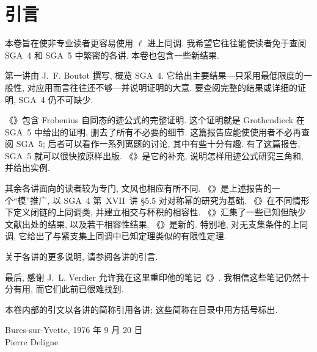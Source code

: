 \chapter*{引言}
本卷旨在使非专业读者更容易使用 $\ell$ 进上同调. 我希望它往往能使读者免于查阅 SGA~4 和 SGA~5 中繁密的各讲. 本卷也包含一些新结果.

第一讲由 J.~F. Boutot 撰写, 概览 SGA~4. 它给出主要结果---只采用最低限度的一般性, 对应用而言往往还不够---并说明证明的大意. 要查阅完整的结果或详细的证明, SGA~4 仍不可缺少.

《》包含 Frobenius 自同态的迹公式的完整证明. 这个证明就是 Grothendieck 在 SGA~5 中给出的证明, 删去了所有不必要的细节. 这篇报告应能使使用者不必再查阅 SGA~5; 后者可以看作一系列离题的讨论, 其中有些十分有趣. 有了这篇报告, SGA~5 就可以很快按原样出版. 《》是它的补充, 说明怎样用迹公式研究三角和, 并给出实例.

其余各讲面向的读者较为专门, 文风也相应有所不同. 《》是上述报告的一个“模”推广, 以 SGA~4 第~XVII~讲 \S5.5 对对称幂的研究为基础. 《》在不同情形下定义闭链的上同调类, 并建立相交与杯积的相容性. 《》汇集了一些已知但缺少文献出处的结果, 以及若干相容性结果. 《》是新的. 特别地, 对无支集条件的上同调, 它给出了与紧支集上同调中已知定理类似的有限性定理.

关于各讲的更多说明, 请参阅各讲的引言.

最后, 感谢 J.~L. Verdier 允许我在这里重印他的笔记《》. 我相信这些笔记仍然十分有用, 而它们此前已很难找到.

本卷内部的引文以各讲的简称引用各讲; 这些简称在目录中用方括号标出.

\vspace{20pt}
\begin{flushright}
Bures-sur-Yvette, 1976 年 9 月 20 日\\[5pt]
Pierre Deligne
\end{flushright}

